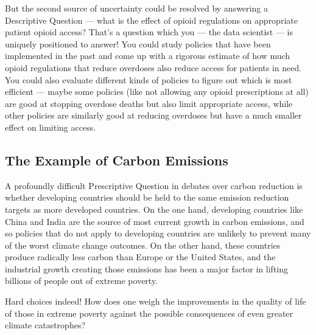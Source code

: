 \documentclass[letterpaper,10pt,english]{jupyterBook}
\begin{document}
\sphinxAtStartPar
But the second source of uncertainty could be resolved by answering a Descriptive Question — what is the effect of opioid regulations on appropriate patient opioid access? That’s a question which you — the data scientist — is uniquely positioned to answer! You could study policies that have been implemented in the past and come up with a rigorous estimate of how much opioid regulations that reduce overdoses also reduce access for patients in need. You could also evaluate different kinds of policies to figure out which is most efficient — maybe some policies (like not allowing any opioid prescriptions at all) are good at stopping overdose deaths but also  limit appropriate access, while other policies are similarly good at reducing overdoses but have a much smaller effect on limiting access.


\subsection{The Example of Carbon Emissions}
\label{\detokenize{30_questions/06_descriptive_prescriptive_examples:the-example-of-carbon-emissions}}
\sphinxAtStartPar
A profoundly difficult Prescriptive Question in debates over carbon reduction is whether developing countries should be held to the same emission reduction targets as more developed countries. On the one hand, developing countries like China and India are the source of most current growth in carbon emissions, and so policies that do not apply to developing countries are unlikely to prevent many of the worst climate change outcomes. On the other hand, these countries produce radically less carbon  than Europe or the United States, and the industrial growth creating those emissions has been a major factor in lifting billions of people out of extreme poverty.

\sphinxAtStartPar
Hard choices indeed! How does one weigh the improvements in the quality of life of those in extreme poverty against the possible consequences of even greater climate catastrophes?
\end{document}

